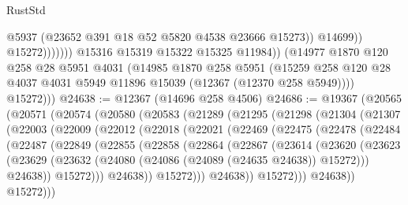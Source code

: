 \begin{lexlean}{RustStd}
\begin{coremodule}
                                @5937
                                (@23652 @391 @18 @52 @5820 @4538 @23666 @15273))
                              @14699))
                          @15272)))))))
            @15316
            @15319
            @15322
            @15325
            @11984))
        (@14977
          @1870
          @120
          @258
          @28
          @5951
          @4031
          (@14985
            @1870
            @258
            @5951
            (@15259 @258 @120 @28 @4037 @4031 @5949 @11896 @15039 (@12367 (@12370 @258 @5949))))
          @15272)))
@24638 := @12367 (@14696 @258 @4506)
@24686 := @19367
    (@20565
      (@20571
        (@20574
          (@20580
            (@20583
              (@21289
                (@21295
                  (@21298
                    (@21304
                      (@21307
                        (@22003
                          (@22009
                            (@22012
                              (@22018
                                (@22021
                                  (@22469
                                    (@22475
                                      (@22478
                                        (@22484
                                          (@22487
                                            (@22849
                                              (@22855
                                                (@22858
                                                  (@22864
                                                    (@22867
                                                      (@23614
                                                        (@23620
                                                          (@23623
                                                            (@23629
                                                              (@23632
                                                                (@24080
                                                                  (@24086
                                                                    (@24089 (@24635 @24638))
                                                                    @15272)))
                                                              @24638))
                                                          @15272)))
                                                    @24638))
                                                @15272)))
                                          @24638))
                                      @15272)))
                                @24638))
                            @15272)))

\end{coremodule}
\end{lexlean}

